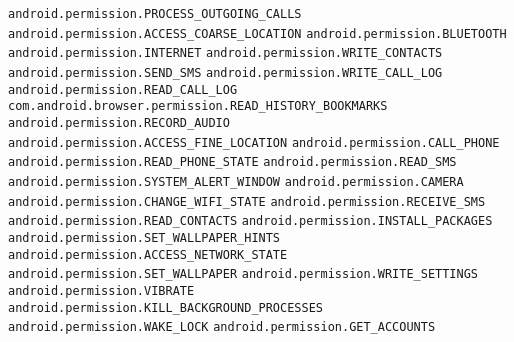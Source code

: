 \texttt{android.permission.PROCESS\_OUTGOING\_CALLS}
\newline \texttt{android.permission.ACCESS\_COARSE\_LOCATION}
\newline \texttt{android.permission.BLUETOOTH}
\newline \texttt{android.permission.INTERNET}
\newline \texttt{android.permission.WRITE\_CONTACTS}
\newline \texttt{android.permission.SEND\_SMS}
\newline \texttt{android.permission.WRITE\_CALL\_LOG}
\newline \texttt{android.permission.READ\_CALL\_LOG}
\newline \texttt{com.android.browser.permission.READ\_HISTORY\_BOOKMARKS}
\newline \texttt{android.permission.RECORD\_AUDIO}
\newline \texttt{android.permission.ACCESS\_FINE\_LOCATION}
\newline \texttt{android.permission.CALL\_PHONE}
\newline \texttt{android.permission.READ\_PHONE\_STATE}
\newline \texttt{android.permission.READ\_SMS}
\newline \texttt{android.permission.SYSTEM\_ALERT\_WINDOW}
\newline \texttt{android.permission.CAMERA}
\newline \texttt{android.permission.CHANGE\_WIFI\_STATE}
\newline \texttt{android.permission.RECEIVE\_SMS}
\newline \texttt{android.permission.READ\_CONTACTS}
\newline \texttt{android.permission.INSTALL\_PACKAGES}
\newline \texttt{android.permission.SET\_WALLPAPER\_HINTS}
\newline \texttt{android.permission.ACCESS\_NETWORK\_STATE}
\newline \texttt{android.permission.SET\_WALLPAPER}
\newline \texttt{android.permission.WRITE\_SETTINGS}
\newline \texttt{android.permission.VIBRATE}
\newline \texttt{android.permission.KILL\_BACKGROUND\_PROCESSES}
\newline \texttt{android.permission.WAKE\_LOCK}
\newline \texttt{android.permission.GET\_ACCOUNTS}
